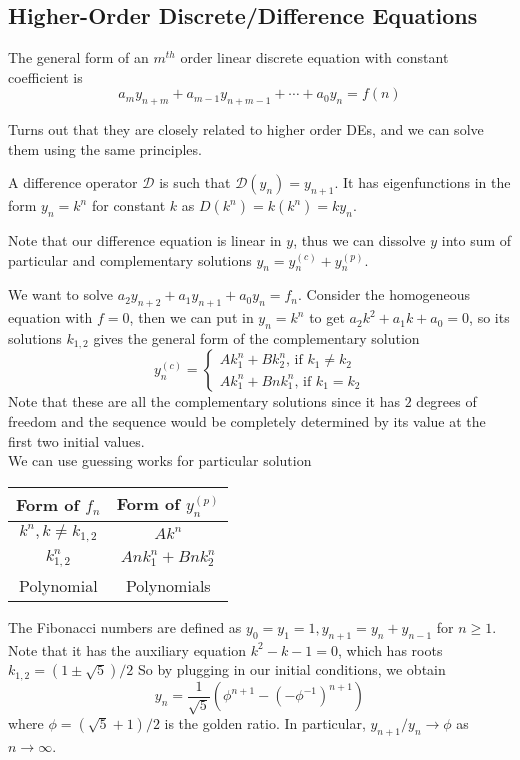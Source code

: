 \subsection{Higher-Order Discrete/Difference Equations}
\begin{definition}
    The general form of an $m^{th}$ order linear discrete equation with constant coefficient is
    $$a_my_{n+m}+a_{m-1}y_{n+m-1}+\cdots+a_0y_n=f(n)$$
\end{definition}
Turns out that they are closely related to higher order DEs, and we can solve them using the same principles.
\begin{definition}
    A difference operator $\mathcal D$ is such that $\mathcal D (y_n)=y_{n+1}$.
    It has eigenfunctions in the form $y_n=k^n$ for constant $k$ as $D(k^n)=k(k^n)=ky_n$.
\end{definition}
Note that our difference equation is linear in $y$, thus we can dissolve $y$ into sum of particular and complementary solutions $y_n=y_n^{(c)}+y_n^{(p)}$.
\begin{example}
    We want to solve $a_2y_{n+2}+a_1y_{n+1}+a_0y_n=f_n$.
    Consider the homogeneous equation with $f=0$, then we can put in $y_n=k^n$ to get $a_2k^2+a_1k+a_0=0$, so its solutions $k_{1,2}$ gives the general form of the complementary solution
    $$
    y_n^{(c)}=
    \begin{cases}
        Ak_1^n+Bk_2^n\text{, if $k_1\neq k_2$}\\
        Ak_1^n+Bnk_1^n\text{, if $k_1=k_2$}
    \end{cases}
    $$
    Note that these are all the complementary solutions since it has $2$ degrees of freedom and the sequence would be completely determined by its value at the first two initial values.\\
    We can use guessing works for particular solution
    \begin{center}
        \begin{tabular}{c|c}
            Form of $f_n$&Form of $y_n^{(p)}$\\
            \hline
            $k^n,k\neq k_{1,2}$&$Ak^n$\\
            $k_{1,2}^n$&$Ank_1^n+Bnk_2^n$\\
            Polynomial&Polynomials
        \end{tabular}
    \end{center}
\end{example}
The Fibonacci numbers are defined as $y_0=y_1=1,y_{n+1}=y_n+y_{n-1}$ for $n\ge 1$.
Note that it has the auxiliary equation $k^2-k-1=0$, which has roots $k_{1,2}=(1\pm\sqrt{5})/2$
So by plugging in our initial conditions, we obtain
$$y_n=\frac{1}{\sqrt{5}}(\phi^{n+1}-(-\phi^{-1})^{n+1})$$
where $\phi=(\sqrt{5}+1)/2$ is the golden ratio.
In particular, $y_{n+1}/y_n\to\phi$ as $n\to\infty$.
